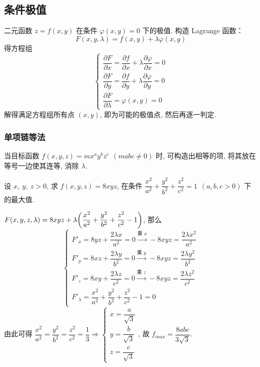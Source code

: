 \subsection{条件极值}

二元函数 $ z=f(x, y) $ 在条件 $ \varphi(x, y)=0 $ 下的极值.
构造 Lagrange 函数：
$$F(x, y, \lambda)=f(x, y)+\lambda \varphi(x, y)$$
得方程组
$$\begin{cases}
    \dfrac{\partial F}{\partial x}=\dfrac{\partial f}{\partial x}+\lambda \dfrac{\partial \varphi}{\partial x}=0 \\[6pt]
\dfrac{\partial F}{\partial y}=\dfrac{\partial f}{\partial y}+\lambda \dfrac{\partial \varphi}{\partial y}=0 \\[6pt]
\dfrac{\partial F}{\partial \lambda}=\varphi(x, y)=0
\end{cases}$$
解得满足方程组所有点 $ (x, y) $, 即为可能的极值点, 然后再逐一判定.

\subsubsection{单项链等法}

当目标函数 $f(x,y,z)=mx^ay^bz^c~~(mabc\neq0)$ 时, 可构造出相等的项, 将其放在等号一边使其连等, 消除 $\lambda$.

\begin{example}
    设 $x,~y,~z>0$, 求 $f(x,y,z)=8xyz$, 在条件 $\dfrac{x^2}{a^2}+\dfrac{y^2}{b^2}+\dfrac{z^2}{c^2}=1~~(a,b,c>0)$ 下的最大值.
\end{example}
\begin{solution}
    $F(x,y,z,\lambda)=8xyz+\lambda\qty(\dfrac{x^2}{a^2}+\dfrac{y^2}{b^2}+\dfrac{z^2}{c^2}-1)$, 那么 
    $$\begin{cases}
        F'_x=8 y z + \dfrac{2 \lambda x}{a^{2}}=0 \xrightarrow{\text{乘 }x} -8xyz=\dfrac{2\lambda x^2}{a^2}\\
        F'_y=8 x z + \dfrac{2 \lambda y}{b^{2}}=0 \xrightarrow{\text{乘 }y} -8xyz=\dfrac{2\lambda y^2}{b^2}\\
        F'_z=8 x y + \dfrac{2 \lambda z}{c^{2}}=0 \xrightarrow{\text{乘 }z} -8xyz=\dfrac{2\lambda z^2}{c^2}\\
        F'_\lambda=\dfrac{x^{2}}{a^{2}}+ \dfrac{y^{2}}{b^{2}} +\dfrac{z^{2}}{c^{2}}  -1=0
    \end{cases}$$
    由此可得 $\dfrac{x^2}{a^2}=\dfrac{y^2}{b^2}=\dfrac{z^2}{c^2}=\dfrac{1}{3}\Rightarrow\begin{cases}
        x=\dfrac{a}{\sqrt{3}}\\ y=\dfrac{b}{\sqrt{3}}\\ z=\dfrac{c}{\sqrt{3}} 
    \end{cases}$, 故 $f_{max}=\dfrac{8abc}{3\sqrt{3}}.$
\end{solution}

